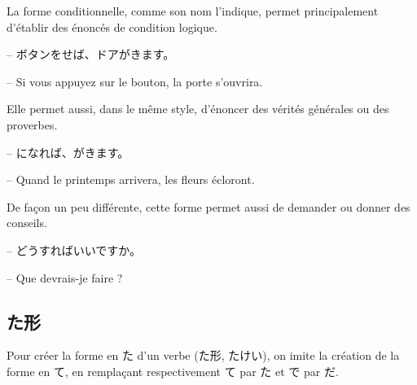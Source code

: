 La forme conditionnelle, comme son nom l'indique, permet principalement d'établir des énoncés de condition logique.

\begin{tcolorbox}
    -- ボタンをせば、ドアがきます。

    -- Si vous appuyez sur le bouton, la porte s'ouvrira.
\end{tcolorbox}

Elle permet aussi, dans le même style, d'énoncer des vérités générales ou des proverbes.

\begin{tcolorbox}
    -- になれば、がきます。

    -- Quand le printemps arrivera, les fleurs écloront.
\end{tcolorbox}

De façon un peu différente, cette forme permet aussi de demander ou donner des conseils.

\begin{tcolorbox}
    -- どうすればいいですか。

    -- Que devrais-je faire ?
\end{tcolorbox}

\subsection{た形}

Pour créer la forme en た d'un verbe (た形, たけい), on imite la création de la forme en て, en remplaçant respectivement て par た et で par だ.

